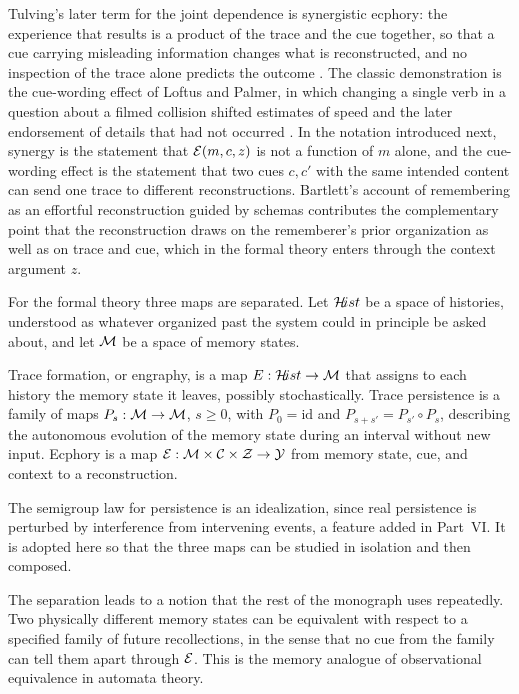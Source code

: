 Tulving's later term for the joint dependence is synergistic ecphory: the experience that results is a product of the trace and the cue together, so that a cue carrying misleading information changes what is reconstructed, and no inspection of the trace alone predicts the outcome \cite{tulving1983}. The classic demonstration is the cue-wording effect of Loftus and Palmer, in which changing a single verb in a question about a filmed collision shifted estimates of speed and the later endorsement of details that had not occurred \cite{loftus1974}. In the notation introduced next, synergy is the statement that $\mathcal{E}(m,c,z)$ is not a function of $m$ alone, and the cue-wording effect is the statement that two cues $c,c'$ with the same intended content can send one trace to different reconstructions. Bartlett's account of remembering as an effortful reconstruction guided by schemas \cite{bartlett1932} contributes the complementary point that the reconstruction draws on the rememberer's prior organization as well as on trace and cue, which in the formal theory enters through the context argument $z$.

For the formal theory three maps are separated. Let $\mathcal{H}\!ist$ be a space of histories, understood as whatever organized past the system could in principle be asked about, and let $\mathcal{M}$ be a space of memory states.

\begin{definition}\label{def:triple}
Trace formation, or engraphy, is a map $E:\mathcal{H}\!ist\to\mathcal{M}$ that assigns to each history the memory state it leaves, possibly stochastically. Trace persistence is a family of maps $P_{s}:\mathcal{M}\to\mathcal{M}$, $s\ge 0$, with $P_0=\mathrm{id}$ and $P_{s+s'}=P_{s'}\circ P_s$, describing the autonomous evolution of the memory state during an interval without new input. Ecphory is a map $\mathcal{E}:\mathcal{M}\times\mathcal{C}\times\mathcal Z\to\mathcal{Y}$ from memory state, cue, and context to a reconstruction.
\end{definition}

The semigroup law for persistence is an idealization, since real persistence is perturbed by interference from intervening events, a feature added in Part~VI. It is adopted here so that the three maps can be studied in isolation and then composed.

The separation leads to a notion that the rest of the monograph uses repeatedly. Two physically different memory states can be equivalent with respect to a specified family of future recollections, in the sense that no cue from the family can tell them apart through $\mathcal{E}$. This is the memory analogue of observational equivalence in automata theory.

